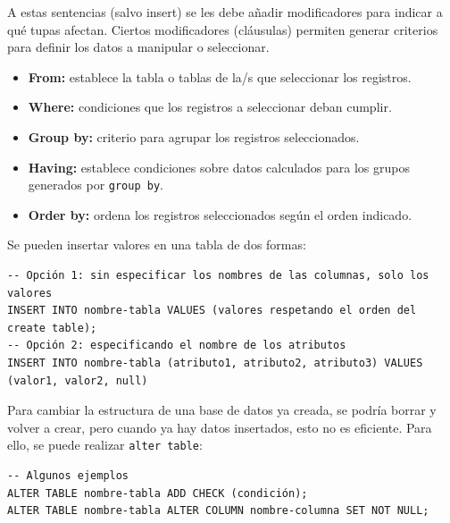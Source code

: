A estas sentencias (salvo insert) se les debe añadir modificadores para indicar a qué tupas afectan. Ciertos modificadores (cláusulas) permiten generar criterios para definir los datos a manipular o seleccionar.
\begin{itemize}
\item \textbf{From:} establece la tabla o tablas de la/s que seleccionar los registros.
\item \textbf{Where:} condiciones que los registros a seleccionar deban cumplir.
\item \textbf{Group by:} criterio para agrupar los registros seleccionados.
\item \textbf{Having:} establece condiciones sobre datos calculados para los grupos generados por \texttt{group by}.
\item \textbf{Order by:} ordena los registros seleccionados según el orden indicado.
\end{itemize}

Se pueden insertar valores en una tabla de dos formas:
\begin{lstlisting}
-- Opción 1: sin especificar los nombres de las columnas, solo los valores
INSERT INTO nombre-tabla VALUES (valores respetando el orden del create table);
-- Opción 2: especificando el nombre de los atributos
INSERT INTO nombre-tabla (atributo1, atributo2, atributo3) VALUES (valor1, valor2, null)
\end{lstlisting}

Para cambiar la estructura de una base de datos ya creada, se podría borrar y volver a crear, pero cuando ya hay datos insertados, esto no es eficiente. Para ello, se puede realizar \texttt{alter table}:
\begin{lstlisting}
-- Algunos ejemplos
ALTER TABLE nombre-tabla ADD CHECK (condición);
ALTER TABLE nombre-tabla ALTER COLUMN nombre-columna SET NOT NULL;
\end{lstlisting}
